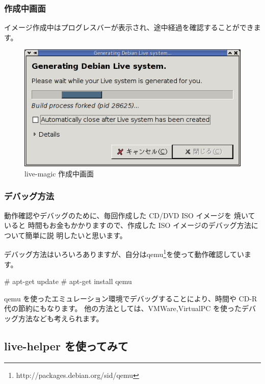 \documentclass[mingoth,a4paper]{jsarticle}
\begin{document}
\subsubsection{作成中画面}

\begin{multicols}{2}
 イメージ作成中はプログレスバーが表示され、途中経過を確認することができます。

 \begin{figure}[H]
 \begin{center}
  \includegraphics[width=1\hsize]{image200711/live-magic07.png}
 \end{center}
 \caption{live-magic 作成中画面}
 \label{live-magic07}
 \end{figure}
\end{multicols}

\subsubsection{デバッグ方法}
動作確認やデバッグのために、毎回作成した CD/DVD ISO イメージを 焼いていると
時間もお金もかかりますので、作成した ISO イメージのデバッグ方法について簡単に説
明したいと思います。

デバッグ方法はいろいろありますが、自分はqemu\footnote{http://packages.debian.org/sid/qemu}を使って動作確認しています。
\begin{commandline}
# apt-get update
# apt-get install qemu
\end{commandline}
qemu を使ったエミュレーション環境でデバッグすることにより、時間や CD-R 代の節約にもなります。
他の方法としては、VMWare,VirtualPC を使ったデバッグ方法なども考えられます。

\subsection{live-helper を使ってみて}
\end{document}
